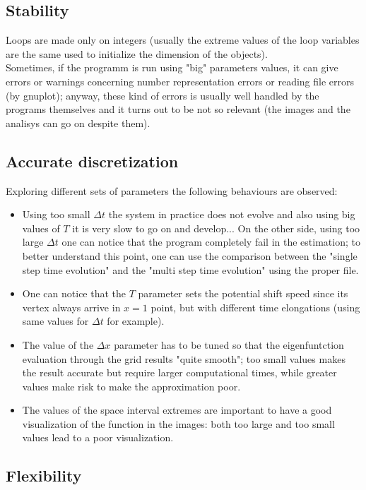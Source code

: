 \documentclass[12pt, a4paper, notitlepage]{report}
\begin{document}
\subsection*{Stability}

Loops are made only on integers (usually the extreme values of the loop variables are the same used to initialize the dimension of the objects).\\
Sometimes, if the programm is run using "big" parameters values, it can give errors or warnings concerning number representation errors or reading file errors (by gnuplot); anyway, these kind of errors is usually well handled by the programs themselves and it turns out to be not so relevant (the images and the analisys can go on despite them).


\subsection*{Accurate discretization}

Exploring different sets of parameters the following behaviours are observed:
\begin{itemize}
	\item Using too small $\Delta t$ the system in practice does not evolve and also using big values of $T$ it is very slow to go on and develop... On the other side, using too large $\Delta t$ one can notice that the program completely fail in the estimation; to better understand this point, one can use the comparison between the "single step time evolution" and the "multi step time evolution" using the proper file.
	\item One can notice that the $T$ parameter sets the potential shift speed since its vertex always arrive in $x=1$ point, but with different time elongations (using same values for $\Delta t$ for example).
	\item The value of the $\Delta x$ parameter has to be tuned so that the eigenfuntction evaluation through the grid results "quite smooth"; too small values makes the result accurate but require larger computational times, while greater values make risk to make the approximation poor.
	\item The values of the space interval extremes are important to have a good visualization of the function in the images: both too large and too small values lead to a poor visualization.
\end{itemize}

\subsection*{Flexibility}
\end{document}
